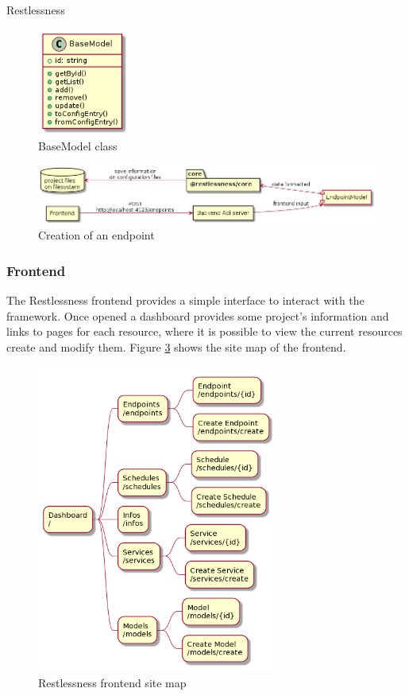 \begin{chapter}{Restlessness}
    \begin{figure}
        \centering
        \includegraphics[width=3cm]{source/diagrams/rln_backend_base_model.png}
        \caption{BaseModel class}
        \label{fig:base_model_class}
    \end{figure}

    \begin{figure}
        \centering
        \includegraphics[width=\linewidth]{source/diagrams/rln_backend_endpoint_creation.png}
        \caption{Creation of an endpoint}
        \label{fig:backend_endpoint_flow}
    \end{figure}

    \subsubsection{Frontend}
    The Restlessness frontend provides a simple interface to interact with the
    framework. Once opened a dashboard provides some project's information and
    links to pages for each resource, where it is possible to view the current
    resources create and modify them.
    Figure \ref{fig:frontend_site_map} shows the site map of the frontend.

    \begin{figure}
        \centering
        \includegraphics[width=8cm]{source/diagrams/frontend_site_map.png}
        \caption{Restlessness frontend site map}
        \label{fig:frontend_site_map}
    \end{figure}


\end{chapter}

